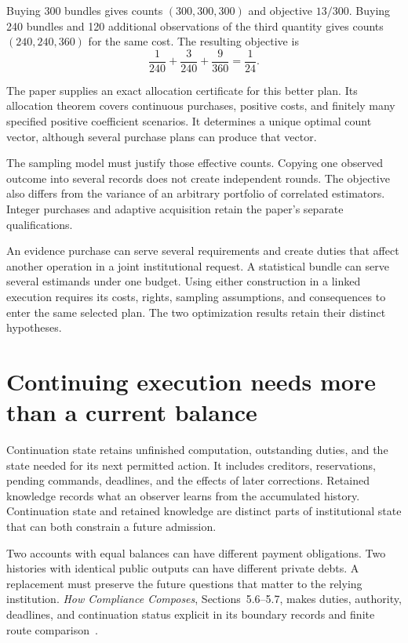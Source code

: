 \documentclass{momentum}
\begin{document}
Buying 300 bundles gives counts $(300,300,300)$ and objective $13/300$.
Buying 240 bundles and 120 additional observations of the third quantity gives counts $(240,240,360)$ for the same cost.
The resulting objective is
\[
\frac{1}{240}+\frac{3}{240}+\frac{9}{360}=\frac{1}{24}.
\]

The paper supplies an exact allocation certificate for this better plan.
Its allocation theorem covers continuous purchases, positive costs, and finitely many specified positive coefficient scenarios.
It determines a unique optimal count vector, although several purchase plans can produce that vector.

The sampling model must justify those effective counts.
Copying one observed outcome into several records does not create independent rounds.
The objective also differs from the variance of an arbitrary portfolio of correlated estimators.
Integer purchases and adaptive acquisition retain the paper's separate qualifications.

An evidence purchase can serve several requirements and create duties that affect another operation in a joint institutional request.
A statistical bundle can serve several estimands under one budget.
Using either construction in a linked execution requires its costs, rights, sampling assumptions, and consequences to enter the same selected plan.
The two optimization results retain their distinct hypotheses.

\section{Continuing execution needs more than a current balance}
\label{sec:continuation}

Continuation state retains unfinished computation, outstanding duties, and the state needed for its next permitted action.
It includes creditors, reservations, pending commands, deadlines, and the effects of later corrections.
Retained knowledge records what an observer learns from the accumulated history.
Continuation state and retained knowledge are distinct parts of institutional state that can both constrain a future admission.

Two accounts with equal balances can have different payment obligations.
Two histories with identical public outputs can have different private debts.
A replacement must preserve the future questions that matter to the relying institution.
\emph{How Compliance Composes}, Sections~5.6--5.7, makes duties, authority, deadlines, and continuation status explicit in its boundary records and finite route comparison~\cite{compliance}.
\end{document}
